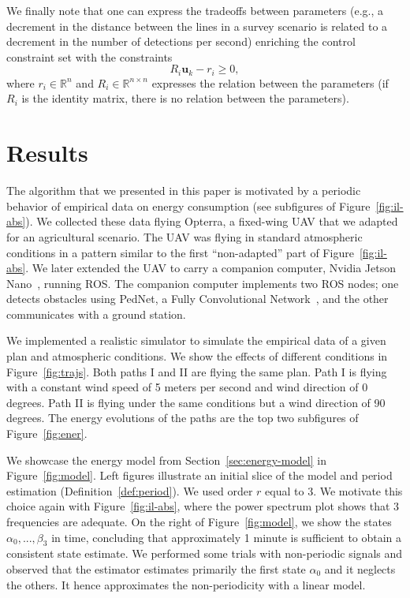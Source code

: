 \documentclass[letterpaper,10pt,conference]{ieeeconf}
\theoremstyle{definition}
\begin{document}
We finally note that one can express the tradeoffs between parameters (e.g., a decrement in the distance between the lines in a survey scenario is related to a decrement in the number of detections per second) enriching the control constraint set with the constraints
\begin{equation*}
  R_i\mathbf{u}_k-r_i\geq 0,
\end{equation*}
where $r_i\in\mathbb{R}^n$ and $R_i\in\mathbb{R}^{n\times n}$ expresses the relation between the parameters (if $R_i$ is the identity matrix, there is no relation between the parameters).


\section{Results}         %
\label{sec:experimental}  %

The algorithm that we presented in this paper is motivated by a periodic behavior of empirical data on energy consumption (see subfigures of Figure~\ref{fig:il-abs}). We collected these data flying Opterra, a fixed-wing UAV that we adapted for an agricultural scenario. The UAV was flying in standard atmospheric conditions in a pattern similar to the first ``non-adapted'' part of Figure~\ref{fig:il-abs}. We later extended the UAV to carry a companion computer, Nvidia Jetson Nano~\cite{nano}, running ROS. The companion computer implements two ROS nodes; one detects obstacles using PedNet, a Fully Convolutional Network~\cite{ullah2018pednet}, and the other communicates with a ground station.

We implemented a realistic simulator to simulate the empirical data of a given plan and atmospheric conditions. We show the effects of different conditions in Figure~\ref{fig:trajs}. Both paths I and II are flying the same plan. Path I is flying with a constant wind speed of 5 meters per second and wind direction of 0 degrees. Path II is flying under the same conditions but a wind direction of 90 degrees. The energy evolutions of the paths are the top two subfigures of Figure~\ref{fig:ener}.

We showcase the energy model from Section~\ref{sec:energy-model} in Figure~\ref{fig:model}. Left figures illustrate an initial slice of the model and period estimation (Definition~\ref{def:period}). We used order $r$ equal to 3. We motivate this choice again with Figure~\ref{fig:il-abs}, where the power spectrum plot shows that 3 frequencies are adequate. On the right of Figure~\ref{fig:model}, we show the states $\alpha_0,...,\beta_3$ in time, concluding that approximately 1 minute is sufficient to obtain a consistent state estimate. We performed some trials with non-periodic signals and observed that the estimator estimates primarily the first state $\alpha_0$ and it neglects the others. It hence approximates the non-periodicity with a linear model.
\end{document}
